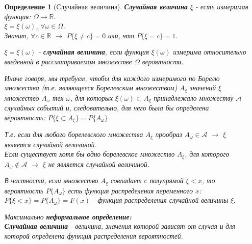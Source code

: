 \documentclass[14pt]{extarticle}
\theoremstyle{breakstyle}
\newtheorem{definition}{Определение}[subsection]
\begin{document}
\begin{definition}[Случайная величина]
\textbf{Случайная величина} $\xi$ - есть измеримая функция: $\Omega \rightarrow \mathbb{R}$. \\
$\xi = \xi(\omega)$, $\forall \omega \in \Omega$. \\
Значит, $\forall c \in \mathbb{R}$ $\rightarrow$ $P\{\xi \neq c\} = 0$ или, что $P\{\xi = c\} = 1$.

\vspace{\baselineskip}

$\xi = \xi(\omega)$ - \textbf{случайная величина}, если функция $\xi(\omega)$ измерима относительно введенной в рассматриваемом множестве $\Omega$ вероятности.

\vspace{\baselineskip}

Иначе говоря, мы требуем, чтобы для каждого измеримого по Борелю множества (т.е. являющееся Борелевским множеством) $A_{\xi}$ значений $\xi$ множество $A_{\omega}$ тех $\omega$, для которых $\xi(\omega) \subset A_{\xi}$ принадлежало множеству $\mathscr{A}$ случайных событий и, следовательно, для него была бы определена вероятность: $P\{\xi \subset A_{\xi}\} = P\{A_{\omega}\}$.

\vspace{\baselineskip}

Т.е. если для любого борелевского множества $A_\xi$ прообраз $A_\omega \in \mathscr{A}$ $\rightarrow$ $\xi$ является случайной величиной. \\
Если существует хотя бы одно борелевское множество $A_\xi$, для которого $A_\omega \notin \mathscr{A}$ $\rightarrow$ $\xi$ не является случайной величиной.

\vspace{\baselineskip}

В частности, если множество $A_{\xi}$ совпадает с полупрямой $\xi < x$, то вероятность $P\{A_{\omega}\}$ есть функция распределения переменного $x$:
$P\{\xi < x\} = P\{A_{\omega}\} = F(x)$ - функция распределения случайной величины $\xi$. \\

\vspace{\baselineskip}

Максимально \textbf{неформальное определение:}\\
\textbf{Случайная величина} - величина, значения которой зависят от случая и для которой определена функция распределения вероятностей. \\


\end{definition}
\end{document}
